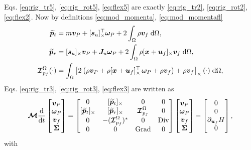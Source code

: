 \documentclass{svjour3}                     %
\DeclareMathOperator*{\Grad}{Grad}
\DeclareMathOperator*{\Div}{Div}
\newcommand{\crmat}[1]{\ensuremath{[#1]_{\times}}}
\begin{document}
Eqs. \eqref{eq:rig_tr5}, \eqref{eq:rig_rot5}, \eqref{eq:flex5} are exactly \eqref{eq:rig_tr2}, \eqref{eq:rig_rot2}, \eqref{eq:flex2}. Now by definitions \eqref{eq:mod_momenta}, \eqref{eq:mod_momentafl}
\begin{align*}
	\widetilde{\bm{p}}_t &= m \bm{v}_P + \crmat{\bm{s}_u}^\top \bm\omega_P +2 \int_{\Omega} \rho \bm{v}_f \d{\Omega}, \\
	\widetilde{\bm{p}}_r &= \crmat{\bm{s}_u} \bm{v}_P + \bm{J}_u \bm\omega_P + 2 \int_{\Omega} \rho \crmat{\bm{x}+\bm{u}_f} {\bm{v}}_f \d{\Omega}, \\
	\bm{\mathcal{I}}_{p_f}^\Omega(\cdot) &= \int_{\Omega} \left[ 2 \left(\rho \bm{v}_P + \rho \crmat{\bm{x}+\bm{u}_f}^\top \, \bm\omega_P +\rho \bm{v}_f\right) + \rho \bm{v}_f \right]_\times (\cdot) \d{\Omega}, 
\end{align*}
Eqs. \eqref{eq:rig_tr3}, \eqref{eq:rig_rot3}, \eqref{eq:flex3} are written as 
\begin{equation}
\bm{\mathcal{M}}
\diff{}{t}
\begin{bmatrix}
	\bm{v}_P \\ \bm\omega_P  \\ \bm{v}_f  \\ \bm\Sigma \\
	\end{bmatrix} = 
	\begin{bmatrix}
	 0 & \crmat{\widetilde{\bm{p}}_t} & 0 & 0 \\
	\crmat{\widetilde{\bm{p}}_t} & \crmat{\widetilde{\bm{p}}_r} & \bm{\mathcal{I}}_{p_f}^\Omega & 0 \\
	0 & -(\bm{\mathcal{I}}_{p_f}^\Omega)^* & 0 & \Div \\
	0 & 0 & \Grad & 0 \\
	\end{bmatrix}
\begin{bmatrix}
	\bm{v}_P \\ \bm\omega_P  \\ \bm{v}_f  \\ \bm\Sigma \\
	\end{bmatrix} - 
	\begin{bmatrix}
	0 \\ 0  \\ \partial_{\bm{u}_f}H  \\ 0 \\
	\end{bmatrix},
\end{equation} 
with
\end{document}
